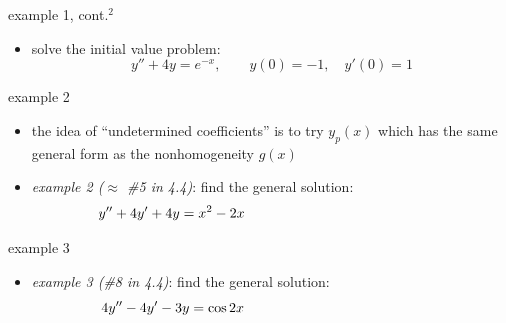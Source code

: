 \documentclass[dvipsnames]{beamer}
\begin{document}
\begin{frame}{example 1, cont.$^2$}

\begin{itemize}
\item solve the initial value problem:
    $$y'' + 4 y = e^{-x}, \qquad y(0)=-1, \quad y'(0)=1$$

\vspace{60mm}
\end{itemize}
\end{frame}


\begin{frame}{example 2}

\begin{itemize}
\item the idea of ``undetermined coefficients'' is to \alert{try $y_p(x)$ which has the same general form as the nonhomogeneity $g(x)$}
\item \emph{example 2 ($\approx$ \#5 in 4.4)}: find the general solution:
    $$y'' + 4 y' + 4y = x^2 - 2 x \hspace{50mm}$$
\end{itemize}

\vspace{50mm}
\end{frame}


\begin{frame}{example 3}

\begin{itemize}
\item \emph{example 3 (\#8 in 4.4)}: find the general solution:
    $$4 y'' - 4 y' - 3 y = \cos 2x \hspace{50mm}$$
\end{itemize}

\vspace{60mm}
\end{frame}
\end{document}
